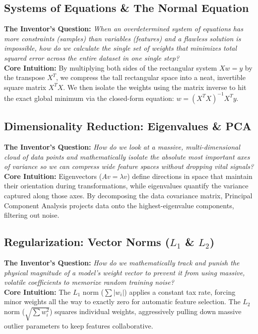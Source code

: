 \documentclass[12pt,a4paper]{article}
\begin{document}
\subsection{Systems of Equations \& The Normal Equation}
\textbf{The Inventor's Question:} \textit{When an overdetermined system of equations has more constraints (samples) than variables (features) and a flawless solution is impossible, how do we calculate the single set of weights that minimizes total squared error across the entire dataset in one single step?} \\
\textbf{Core Intuition:} By multiplying both sides of the rectangular system $Xw = y$ by the transpose $X^T$, we compress the tall rectangular space into a neat, invertible square matrix $X^TX$. We then isolate the weights using the matrix inverse to hit the exact global minimum via the closed-form equation: $w = (X^TX)^{-1}X^Ty$.

\subsection{Dimensionality Reduction: Eigenvalues \& PCA}
\textbf{The Inventor's Question:} \textit{How do we look at a massive, multi-dimensional cloud of data points and mathematically isolate the absolute most important axes of variance so we can compress wide feature spaces without dropping vital signals?} \\
\textbf{Core Intuition:} Eigenvectors ($Av = \lambda v$) define directions in space that maintain their orientation during transformations, while eigenvalues quantify the variance captured along those axes. By decomposing the data covariance matrix, Principal Component Analysis projects data onto the highest-eigenvalue components, filtering out noise.

\subsection{Regularization: Vector Norms ($L_1$ \& $L_2$)}
\textbf{The Inventor's Question:} \textit{How do we mathematically track and punish the physical magnitude of a model's weight vector to prevent it from using massive, volatile coefficients to memorize random training noise?} \\
\textbf{Core Intuition:} The $L_1$ norm ($\sum |w_i|$) applies a constant tax rate, forcing minor weights all the way to exactly zero for automatic feature selection. The $L_2$ norm ($\sqrt{\sum w_i^2}$) squares individual weights, aggressively pulling down massive outlier parameters to keep features collaborative.
\end{document}
